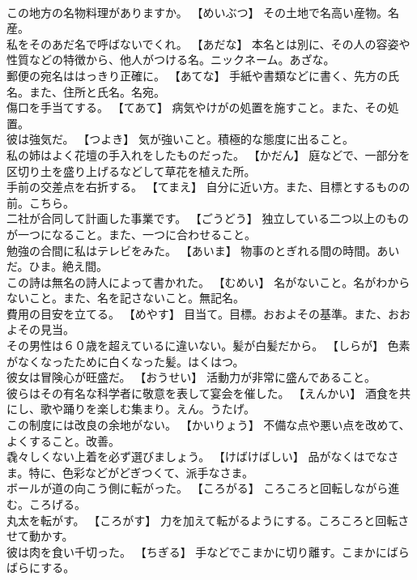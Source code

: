 \documentclass[8pt]{extreport}
\begin{document}
\begin{CJK}{UTF8}{min}
\\	この地方の名物料理がありますか。	【めいぶつ】 その土地で名高い産物。名産。
\\	私をそのあだ名で呼ばないでくれ。	【あだな】 本名とは別に、その人の容姿や性質などの特徴から、他人がつける名。ニックネーム。あざな。
\\	郵便の宛名ははっきり正確に。	【あてな】 手紙や書類などに書く、先方の氏名。また、住所と氏名。名宛。
\\	傷口を手当てする。	【てあて】 病気やけがの処置を施すこと。また、その処置。
\\	彼は強気だ。	【つよき】 気が強いこと。積極的な態度に出ること。
\\	私の姉はよく花壇の手入れをしたものだった。	【かだん】 庭などで、一部分を区切り土を盛り上げるなどして草花を植えた所。
\\	手前の交差点を右折する。	【てまえ】 自分に近い方。また、目標とするものの前。こちら。
\\	二社が合同して計画した事業です。	【ごうどう】 独立している二つ以上のものが一つになること。また、一つに合わせること。
\\	勉強の合間に私はテレビをみた。	【あいま】 物事のとぎれる間の時間。あいだ。ひま。絶え間。
\\	この詩は無名の詩人によって書かれた。	【むめい】 名がないこと。名がわからないこと。また、名を記さないこと。無記名。
\\	費用の目安を立てる。	【めやす】 目当て。目標。おおよその基準。また、おおよその見当。
\\	その男性は６０歳を超えているに違いない。髪が白髪だから。	【しらが】 色素がなくなったために白くなった髪。はくはつ。
\\	彼女は冒険心が旺盛だ。	【おうせい】 活動力が非常に盛んであること。
\\	彼らはその有名な科学者に敬意を表して宴会を催した。	【えんかい】 酒食を共にし、歌や踊りを楽しむ集まり。えん。うたげ。
\\	この制度には改良の余地がない。	【かいりょう】 不備な点や悪い点を改めて、よくすること。改善。
\\	毳々しくない上着を必ず選びましょう。	【けばけばしい】 品がなくはでなさま。特に、色彩などがどぎつくて、派手なさま。
\\	ボールが道の向こう側に転がった。	【ころがる】 ころころと回転しながら進む。ころげる。
\\	丸太を転がす。	【ころがす】 力を加えて転がるようにする。ころころと回転させて動かす。
\\	彼は肉を食い千切った。	【ちぎる】 手などでこまかに切り離す。こまかにばらばらにする。

\end{CJK}
\end{document}
